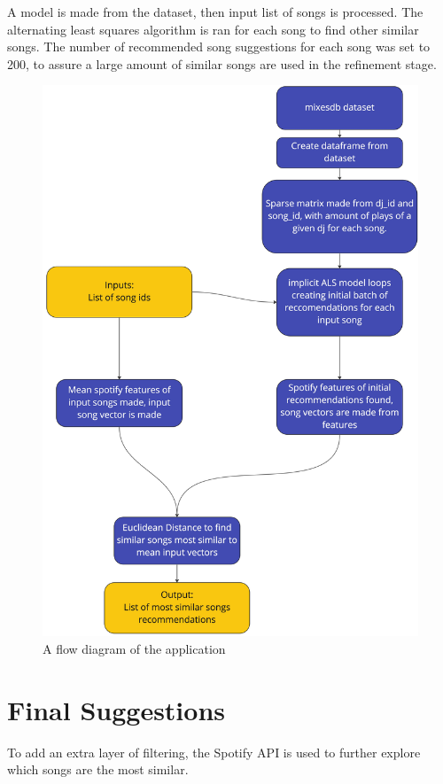 A model is made from the dataset, then input list of songs is processed. The alternating least squares algorithm is ran for each song to find other similar songs. The number of recommended song suggestions for each song was set to 200, to assure a large amount of similar songs are used in the refinement stage.
\begin{figure}[H]{\noindent\ignorespaces}
	\includegraphics[scale=0.09]{images/application_app_flow}
	\centering
	\caption{A flow diagram of the application} 
\end{figure}

\section{Final Suggestions}
To add an extra layer of filtering, the Spotify API is used to further explore which songs are the most similar.


